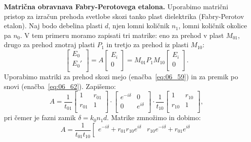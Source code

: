 \begin{example}{\bf Matrična obravnava Fabry-Perotovega etalona.}
Uporabimo matrični pristop za izračun prehoda svetlobe skozi tanko plast dielektrika
(Fabry-Perotov etalon). Naj bodo debelina plasti $d$, njen lomni količnik $n_1$, 
lomni količnik okolice pa $n_0$. V tem primeru moramo zapisati tri matrike:
eno za prehod v plast $M_{01}$, drugo za prehod znotraj plasti $P_1$ in 
tretjo za prehod iz plasti $M_{10}$:
\begin{equation}
\left[\begin{array}{c}
E_{0}\\
E_{0}'\\
\end{array}\right] = 
A
\left[\begin{array}{c}
E_i\\
0\\
\end{array}\right] = 
M_{01}P_1M_{10}
\left[\begin{array}{c}
E_i\\
0\\
\end{array}\right]\!\!.
\label{eq:06_65}
\end{equation}
Uporabimo matriki za prehod skozi mejo (enačba~\ref{eq:06_59}) 
in za premik po snovi (enačba~\ref{eq:06_62}). Zapišemo:
\begin{equation}
A =
\frac{1}{t_{01}}
\left[\begin{array}{cc}
1& r_{01}\\
r_{01}& 1\\
\end{array}\right]\cdot
\left[\begin{array}{cc}
e^{-i\delta}& 0\\
0& e^{i\delta}\\
\end{array}\right]\cdot
\frac{1}{t_{10}}
\left[\begin{array}{cc}
1& r_{10}\\
r_{10}& 1\\
\end{array}\right]\!\!,
\label{eq:06_66}
\end{equation}
pri čemer je fazni zamik $\delta = k_0 n_1 d$. Matrike zmnožimo in dobimo:
\begin{equation}
A =
\frac{1}{t_{01}t_{10}}
\left[\begin{array}{cc}
e^{-i\delta}+r_{01}r_{10}e^{i\delta}& r_{10}e^{-i\delta}+r_{01}e^{i\delta} \\

\end{array}
\end{equation}
\end{example}
